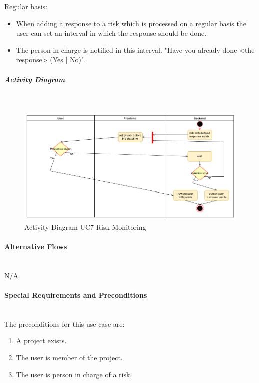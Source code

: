 \noindent
Regular basis:
\begin{itemize}
	\vspace{-3mm}
	\setlength\itemsep{-1em}
	
	\item When adding a response to a risk which is processed on a regular basis the user can set an interval in which the response should be done.
	\item The person in charge is notified in this interval. "Have you already done <the response> (Yes | No)".
\end{itemize}


\subparagraph{Activity Diagram}\mbox{}\\
\begin{figure}[H]
	\centering
	\includegraphics[width=1.0\textwidth]{Content/Domain/UC7RiskMonitoring.png}
	\caption{Activity Diagram \ac{UC}7 Risk Monitoring}
	\label{fig:label77}
\end{figure}

\paragraph*{Alternative Flows}\mbox{}\\
N/A

\paragraph*{Special Requirements and Preconditions}\mbox{}\\
The preconditions for this use case are:
\begin{enumerate}
	\vspace{-3mm}
	\setlength\itemsep{-1em}
	
	\item A project exists.
	\item The user is member of the project.
	\item The user is person in charge of a risk.
\end{enumerate}

